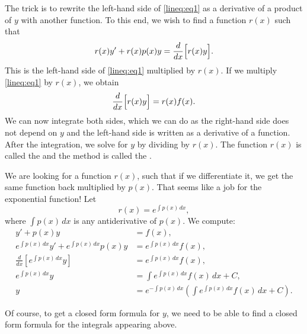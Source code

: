The trick is to rewrite the left-hand side
of \eqref{lineq:eq1} as a derivative of a product of $y$ with another
function.
To this end,
we wish to find a function $r(x)$ such that
\begin{equation*}
r(x) y' + r(x) p(x) y = \frac{d}{dx}\Bigl[ r(x) y \Bigr] .
\end{equation*}
This is the left-hand side of
\eqref{lineq:eq1} multiplied by $r(x)$.  If we multiply \eqref{lineq:eq1} by
$r(x)$, we obtain
\begin{equation*}
\frac{d}{dx}\Bigl[ r(x) y \Bigr] = r(x)f(x) .
\end{equation*}
We can now integrate both sides, which we can do as
the right-hand side does not depend on $y$ and the left-hand side
is written as a derivative of a function.  After the integration, we solve for $y$
by dividing by $r(x)$.
The function $r(x)$ is called the \emph{} and the
method is called the \emph{}.

We are looking for a function $r(x)$, such that if
we differentiate it, we get the same function back multiplied by $p(x)$.
That seems like a job for the exponential function!  Let
\begin{equation*}
r(x) = e^{\int p(x) \,dx} ,
\end{equation*}
where $\int p(x)\, dx$ is any antiderivative of $p(x)$.
We compute:
\begin{equation*}
\begin{aligned}
y' + p(x) y &= f(x) , \\
e^{\int p(x) \,dx} y' + e^{\int p(x) \,dx} p(x) y & = e^{\int p(x) \,dx} f(x) , \\
\frac{d}{dx}\left[ e^{\int p(x) \,dx} y \right] & = e^{\int p(x) \,dx} f(x) , \\
e^{\int p(x) \,dx} y & = \int e^{\int p(x) \,dx} f(x) \,dx + C , \\
y & = e^{-\int p(x) \,dx} \left( \int e^{\int p(x) \,dx} f(x) \,dx + C \right) .
\end{aligned}
\end{equation*}

Of course, to get a closed form formula for $y$,
we need to be able to find a
closed form formula for the integrals appearing above.

